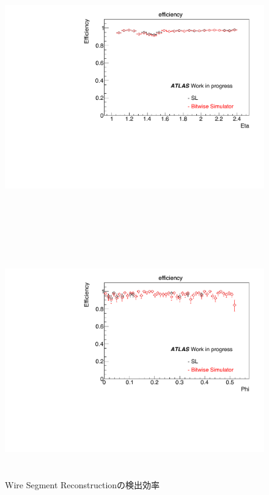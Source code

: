 \begin{figure}
    \begin{minipage}[b]{\linewidth}
    \centering
    \includegraphics[height=10cm]{fig/Test/A_SM_wire_eta.pdf}
    \end{minipage}\\
    \begin{minipage}[b]{\linewidth}
    \centering
    \includegraphics[height=10cm]{fig/Test/A_SM_wire_phi.pdf}
    \end{minipage}%
    \caption[Wire Segment Reconstructionの検出効率]{Wire Segment Reconstructionの検出効率}
    \label{SM_A_Wire}
\end{figure}

